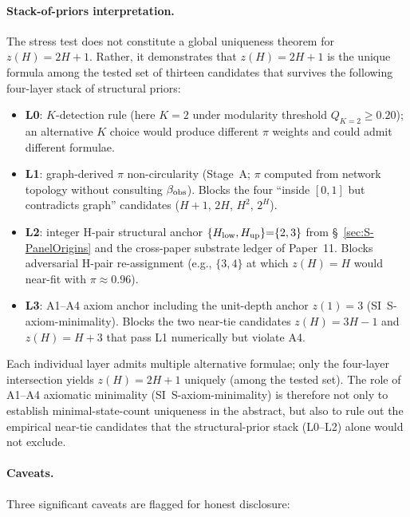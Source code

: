 \paragraph{Stack-of-priors interpretation.}
The stress test does not constitute a global uniqueness theorem for \(z(H){=}2H{+}1\). Rather, it demonstrates that \(z(H){=}2H{+}1\) is the unique formula among the tested set of thirteen candidates that survives the following four-layer stack of structural priors:

\begin{itemize}
\item \textbf{L0}: \(K\)-detection rule (here \(K{=}2\) under modularity threshold \(Q_{K=2}\geq 0.20\)); an alternative \(K\) choice would produce different \(\pi\) weights and could admit different formulae.
\item \textbf{L1}: graph-derived \(\pi\) non-circularity (Stage~A; \(\pi\) computed from network topology without consulting \(\beta_{\rm obs}\)). Blocks the four ``inside \([0,1]\) but contradicts graph'' candidates (\(H{+}1,\,2H,\,H^2,\,2^H\)).
\item \textbf{L2}: integer H-pair structural anchor \(\{H_{\rm low},H_{\rm up}\}{=}\{2,3\}\) from \S~\ref{sec:S-PanelOrigins} and the cross-paper substrate ledger of Paper~11. Blocks adversarial H-pair re-assignment (e.g., \(\{3,4\}\) at which \(z(H){=}H\) would near-fit with \(\pi\approx 0.96\)).
\item \textbf{L3}: A1--A4 axiom anchor including the unit-depth anchor \(z(1){=}3\) (SI~\textsf{S-axiom-minimality}). Blocks the two near-tie candidates \(z(H){=}3H{-}1\) and \(z(H){=}H{+}3\) that pass L1 numerically but violate A4.
\end{itemize}

Each individual layer admits multiple alternative formulae; only the four-layer intersection yields \(z(H){=}2H{+}1\) uniquely (among the tested set). The role of A1--A4 axiomatic minimality (SI~\textsf{S-axiom-minimality}) is therefore not only to establish minimal-state-count uniqueness in the abstract, but also to rule out the empirical near-tie candidates that the structural-prior stack (L0--L2) alone would not exclude.

\paragraph{Caveats.}
Three significant caveats are flagged for honest disclosure:

